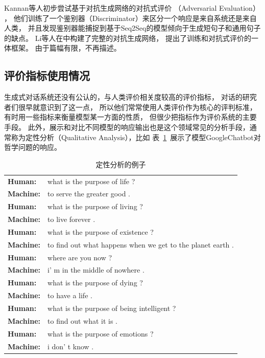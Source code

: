 Kannan等人初步尝试基于对抗生成网络的对抗式评价
（Adversarial Evaluation） ，
他们训练了一个鉴别器（Discriminator）来区分一个响应是来自系统还是来自人类，
并且发现鉴别器能捕捉到基于Seq2Seq的模型倾向于生成短句子和通用句子的缺点。
Li等人在\cite{Adversarial}中构建了完整的对抗生成网络，
提出了训练和对抗式评价的一体框架。
由于篇幅有限，不再描述。


\subsection{评价指标使用情况}\label{subsec:metrics_usage}
生成式对话系统还没有公认的，与人类评价相关度较高的评价指标，
对话的研究者们很早就意识到了这一点，
所以他们常常使用人类评价作为核心的评判标准，有时用一些指标来衡量模型某一方面的性质，
但很少把指标作为评价系统的主要手段。
此外，展示和对比不同模型的响应输出也是这个领域常见的分析手段，通常称为定性分析（Qualitative Analysis），比如
表~\ref{tab:qualitative_analysis}~展示了模型GoogleChatbot对哲学问题的响应。
\begin{table}[H]
    \centering
    \caption{定性分析的例子}
    \label{tab:qualitative_analysis}
    \begin{tabular}{ll}
        \textbf{Human:} & what is the purpose of life ? \\
        \textbf{Machine:} & to serve the greater good .\\
        \textbf{Human:} & what is the purpose of living ? \\
        \textbf{Machine:} & to live forever . \\
        \textbf{Human:} & what is the purpose of existence ? \\
        \textbf{Machine:} & to find out what happens when we get
        to the planet earth . \\
        \textbf{Human:} & where are you now ? \\
        \textbf{Machine:} & i' m in the middle of nowhere . \\
        \textbf{Human:} & what is the purpose of dying ? \\
        \textbf{Machine:} & to have a life . \\
        \textbf{Human:} & what is the purpose of being intelligent ? \\
        \textbf{Machine:} & to find out what it is . \\
        \textbf{Human:} & what is the purpose of emotions ? \\
        \textbf{Machine:} & i don' t know .
    \end{tabular}
\end{table}

